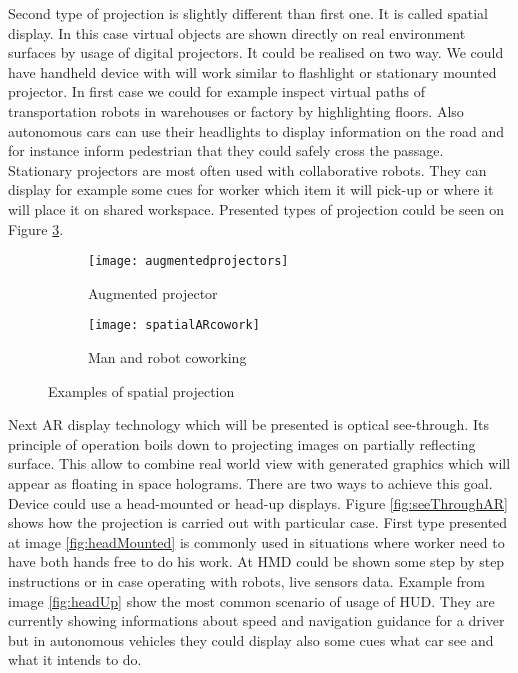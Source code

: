 \documentclass[printmode,en]{mgr}
\begin{document}
Second type of projection is slightly different than first one. It is called spatial display. In this case virtual objects are shown directly on real environment surfaces by usage of digital projectors. It could be realised on two way. We could have handheld device with will work similar to flashlight or stationary mounted projector. In first case we could for example inspect virtual paths of transportation robots in warehouses or factory by highlighting floors. Also autonomous cars can use their headlights to display information on the road and for instance inform pedestrian that they could safely cross the passage. Stationary projectors are most often used with collaborative robots. They can display for example some cues for worker which item it will pick-up or where it will place it on shared workspace. Presented types of projection could be seen on Figure \ref{fig:spatialAR}.

\begin{figure}[!ht]
\centering
\begin{subfigure}{.4\textwidth}
  \centering
  \texttt{[image: augmentedprojectors]}
  \caption{Augmented projector}
  \label{fig:augmentedprojectors}
\end{subfigure}%
\begin{subfigure}{.4\textwidth}
  \centering
  \texttt{[image: spatialARcowork]}
  \caption{Man and robot coworking}
  \label{fig:spatialARcowork}
\end{subfigure}
\caption{Examples of spatial projection}
\label{fig:spatialAR}
\end{figure}

Next AR display technology which will be presented is optical see-through. Its principle of operation boils down to projecting images on partially reflecting surface. This allow to combine real world view with generated graphics which will appear as floating in space holograms. There are two ways to achieve this goal. Device could use a head-mounted or head-up displays. Figure \ref{fig:seeThroughAR} shows how the projection is carried out with particular case. First type presented at image \ref{fig:headMounted} is commonly used in situations where worker need to have both hands free to do his work. At HMD could be shown some step by step instructions or in case operating with robots, live sensors data. Example from image \ref{fig:headUp} show the most common scenario of usage of HUD. They are currently showing informations about speed and navigation guidance for a driver but in autonomous vehicles they could display also some cues what car see and what it intends to do.
\end{document}
